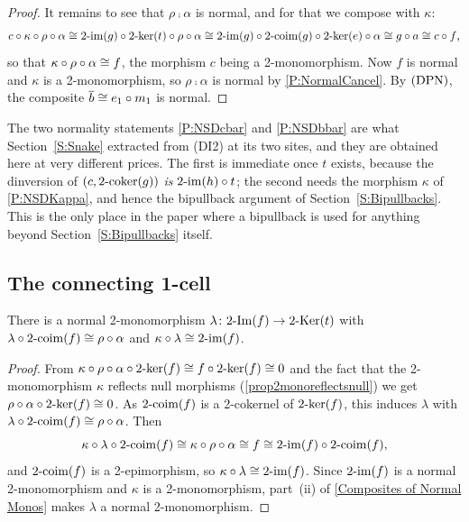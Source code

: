 \begin{proof}
	It remains to see that \(\rho\comp\alpha\) is normal, and for that we compose with \(\kappa\):
	\[
		c\circ\kappa\circ\rho\circ\alpha\cong2\text{-}\mathrm{im}(g)\circ2\text{-}\mathrm{ker}(t)\circ\rho\circ\alpha\cong2\text{-}\mathrm{im}(g)\circ2\text{-}\mathrm{coim}(g)\circ2\text{-}\mathrm{ker}(e)\circ\alpha\cong g\circ a\cong c\circ f\text{,}
	\]
	so that \(\kappa\circ\rho\circ\alpha\cong f\), the morphism \(c\) being a 2-monomorphism. Now \(f\) is normal and \(\kappa\) is a 2-monomorphism, so \(\rho\comp\alpha\) is normal by \prox\ref{P:NormalCancel}. By \(\textup{(DPN)}\), the composite \(\overline{b}\cong e_1\circ m_1\) is normal.
\end{proof}

\begin{remark}
  \label{Rem NSD Sites}
  The two normality statements \prox\ref{P:NSDcbar} and \prox\ref{P:NSDbbar} are what Section~\ref{S:Snake} extracted from \textup{(DI2)} at its two sites, and they are obtained here at very different prices. The first is immediate once \(t\) exists, because the dinversion of \((c,2\text{-}\mathrm{coker}(g))\) \emph{is} \(2\text{-}\mathrm{im}(h)\circ t\); the second needs the morphism \(\kappa\) of \prox\ref{P:NSDKappa}, and hence the bipullback argument of Section~\ref{S:Bipullbacks}. This is the only place in the paper where a bipullback is used for anything beyond Section~\ref{S:Bipullbacks} itself.
\end{remark}

\subsection{The connecting 1-cell}\label{SS:NSDConnecting}

\begin{proposition}
  \label{P:NSDLambda}   \leanok
  There is a normal 2-monomorphism \(\lambda\colon2\text{-}\mathrm{Im}(f)\to2\text{-}\mathrm{Ker}(t)\) with \(\lambda\circ2\text{-}\mathrm{coim}(f)\cong\rho\circ\alpha\) and \(\kappa\circ\lambda\cong2\text{-}\mathrm{im}(f)\).
\end{proposition}

\begin{proof}
  \leanok
  From \(\kappa\circ\rho\circ\alpha\circ2\text{-}\mathrm{ker}(f)\cong f\circ2\text{-}\mathrm{ker}(f)\cong 0\) and the fact that the 2-monomorphism \(\kappa\) reflects null morphisms (\prox\ref{prop2monoreflectsnull}) we get \(\rho\circ\alpha\circ2\text{-}\mathrm{ker}(f)\cong 0\). As \(2\text{-}\mathrm{coim}(f)\) is a 2-cokernel of \(2\text{-}\mathrm{ker}(f)\), this induces \(\lambda\) with \(\lambda\circ2\text{-}\mathrm{coim}(f)\cong\rho\circ\alpha\). Then
	\[
		\kappa\circ\lambda\circ2\text{-}\mathrm{coim}(f)\cong\kappa\circ\rho\circ\alpha\cong f\cong2\text{-}\mathrm{im}(f)\circ2\text{-}\mathrm{coim}(f)\text{,}
	\]
	and \(2\text{-}\mathrm{coim}(f)\) is a 2-epimorphism, so \(\kappa\circ\lambda\cong2\text{-}\mathrm{im}(f)\). Since \(2\text{-}\mathrm{im}(f)\) is a normal 2-monomorphism and \(\kappa\) is a 2-monomorphism, part~\textup{(ii)} of \prox\ref{Composites of Normal Monos} makes \(\lambda\) a normal 2-monomorphism.
\end{proof}

